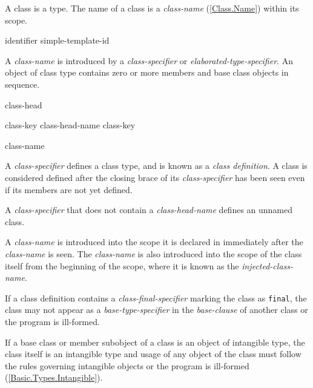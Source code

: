 
\p A class is a type. The name of a class is a \textit{class-name}
(\ref{Class.Name}) within its scope.

\begin{grammar}
  \br
  identifier\br
  simple-template-id
\end{grammar}

A \textit{class-name} is introduced by a \textit{class-specifier} or
\textit{elaborated-type-specifier}. An object of class type contains zero or
more members and base class objects in sequence.

\begin{grammar}
  \br
  class-head \terminal{\{}  \terminal{\}}

  \br
  class-key  class-head-name  \br
  class-key  

  \br
   class-name

  \br

  \br
  \br
\end{grammar}

\p A \textit{class-specifier} defines a class type, and is known as a
\textit{class definition}. A class is considered defined after the closing brace
of its \textit{class-specifier} has been seen even if its members are not yet
defined.

\p A \textit{class-specifier} that does not contain a \textit{class-head-name}
defines an unnamed class.

\p A \textit{class-name} is introduced into the scope it is declared in
immediately after the \textit{class-name} is seen. The \textit{class-name} is
also introduced into the scope of the class itself from the beginning of the
scope, where it is known as the \textit{injected-class-name}.

\p If a class definition contains a \textit{class-final-specifier} marking the
class as \texttt{final}, the class may not appear as a
\textit{base-type-specifier} in the \textit{base-clause} of another class or the
program is ill-formed.

\p If a base class or member subobject of a class is an object of intangible
type, the class itself is an intangible type and usage of any object of the
class must follow the rules governing intangible objects or the program is
ill-formed (\ref{Basic.Types.Intangible}).

